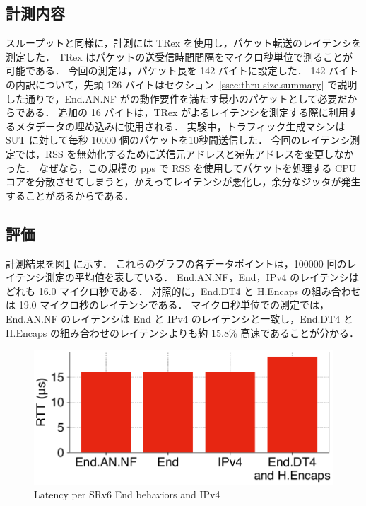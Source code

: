 \subsection{計測内容}
\label{ssec:rtt.summary}
スループットと同様に，計測には TRex を使用し，パケット転送のレイテンシを測定した．
TRex はパケットの送受信時間間隔をマイクロ秒単位で測ることが可能である．
今回の測定は，パケット長を 142 バイトに設定した．
142 バイトの内訳について，先頭 126 バイトはセクション~\ref{ssec:thru-size.summary} で説明した通りで，End.AN.NF がの動作要件を満たす最小のパケットとして必要だからである．
追加の 16 バイトは，TRex がよるレイテンシを測定する際に利用するメタデータの埋め込みに使用される．
実験中，トラフィック生成マシンは SUT に対して毎秒 10000 個のパケットを10秒間送信した．
今回のレイテンシ測定では，RSS を無効化するために送信元アドレスと宛先アドレスを変更しなかった．
なぜなら，この規模の pps で RSS を使用してパケットを処理する CPU コアを分散させてしまうと，かえってレイテンシが悪化し，余分なジッタが発生することがあるからである．

\subsection{評価}
\label{ssec:rtt.eval}
計測結果を図\ref{fig:rtt} に示す．
これらのグラフの各データポイントは，100000 回のレイテンシ測定の平均値を表している．
End.AN.NF，End，IPv4 のレイテンシはどれも 16.0 マイクロ秒である．
対照的に，End.DT4 と H.Encaps の組み合わせは 19.0 マイクロ秒のレイテンシである．
マイクロ秒単位での測定では，End.AN.NF のレイテンシは End と IPv4 のレイテンシと一致し，End.DT4 と H.Encaps の組み合わせのレイテンシよりも約 15.8\% 高速であることが分かる．

\begin{figure}[t]
    \centering
    \includegraphics[width=0.95\linewidth]{img/latency.pdf}
    \caption{Latency per SRv6 End behaviors and IPv4}
    \label{fig:rtt}
\end{figure}